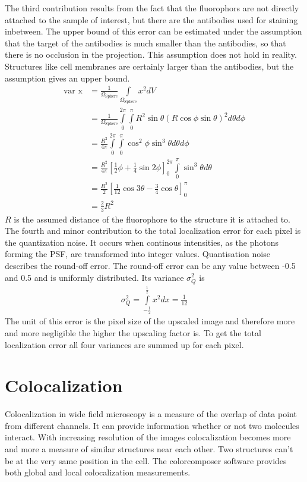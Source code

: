 The third contribution results from the fact that the fluorophors are not directly attached to the sample of interest, but there are the antibodies used for staining inbetween. The upper bound of this error can be estimated under the assumption that the target of the antibodies is much smaller than the antibodies, so that there is no occlusion in the projection. This assumption does not hold in reality. Structures like cell membranes are certainly larger than the antibodies, but the assumption gives an upper bound. 
\begin{align}
\text{var x} &=\frac{1}{\Omega_\text{Sphere}}\int\limits_{\Omega_\text{Sphere}} x^2 dV\\ 
&=\frac{1}{\Omega_\text{Sphere}}\int\limits_0^{2\pi}\int\limits_0^\pi R^2\sin\theta \left(R\cos\phi \sin\theta\right)^2 d\theta d\phi\\
&=\frac{R^2}{4\pi} \int\limits_0^{2\pi}\int\limits_0^\pi \cos^2\phi \sin^3\theta d\theta d\phi\\
&=\frac{R^2}{4\pi} \left[\frac{1}{2}\phi +\frac{1}{4}\sin 2\phi \right]_0^{2\pi}\int\limits_0^\pi \sin^3\theta d\theta \\
&=\frac{ R^2}{2} \left[\frac{1}{12}\cos3\theta -\frac{3}{4}\cos\theta \right]_0^\pi\\
&=\frac{2}{3} R^2
\end{align}
$R$ is the assumed distance of the fluorophore to the structure it is attached to.\newline
The fourth and minor contribution to the total localization error for each pixel is the quantization noise. It occurs when continous intensities, as the photons forming the PSF, are transformed into integer values. Quantisation noise describes the round-off error. The round-off error can be any value between -0.5 and 0.5 and is uniformly distributed. Its variance $\sigma_Q^2$ is
\begin{align}
 \sigma_Q^2 =\int\limits_{-\frac{1}{2}}^{\frac{1}{2}} x^2 dx = \frac{1}{12}
\end{align}
The unit of this error is the pixel size of the upscaled image and therefore more and more negligible the higher the upscaling factor is.\newline
To get the total localization error all four variances are summed up for each pixel.

\section{Colocalization}
Colocalization in wide field microscopy is a measure of the overlap of data point from different channels. It can provide information whether or not two molecules interact. With increasing resolution of the images colocalization becomes more and more a measure of similar structures near each other. Two structures can't be at the very same position in the cell. The colorcomposer software provides both global and local colocalization measurements.
